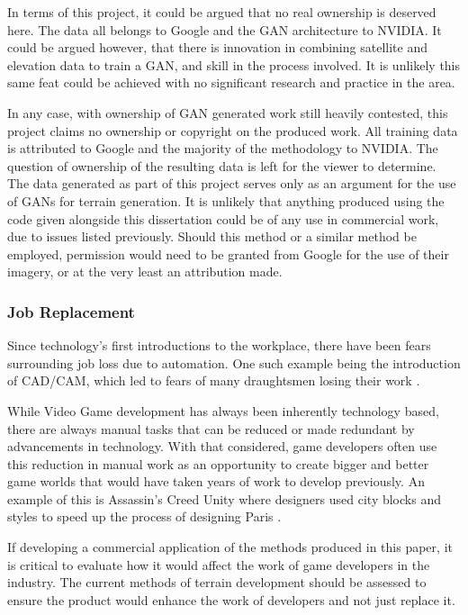 \documentclass[a4paper]{report}
\begin{document}
In terms of this project, it could be argued that no real ownership is deserved here. The data all belongs to Google and the GAN architecture to NVIDIA. It could be argued however, that there is innovation in combining satellite and elevation data to train a GAN, and skill in the process involved. It is unlikely this same feat could be achieved with no significant research and practice in the area.

In any case, with ownership of GAN generated work still heavily contested, this project claims no ownership or copyright on the produced work. All training data is attributed to Google and the majority of the methodology to NVIDIA. The question of ownership of the resulting data is left for the viewer to determine. The data generated as part of this project serves only as an argument for the use of GANs for terrain generation. It is unlikely that anything produced using the code given alongside this dissertation could be of any use in commercial work, due to issues listed previously. Should this method or a similar method be employed, permission would need to be granted from Google for the use of their imagery, or at the very least an attribution made.

\subsubsection{Job Replacement}
Since technology's first introductions to the workplace, there have been fears surrounding job loss due to automation. One such example being the introduction of CAD/CAM, which led to fears of many draughtsmen losing their work \cite{ToDo}.

While Video Game development has always been inherently technology based, there are always manual tasks that can be reduced or made redundant by advancements in technology. With that considered, game developers often use this reduction in manual work as an opportunity to create bigger and better game worlds that would have taken years of work to develop previously. An example of this is Assassin's Creed Unity where designers used city blocks and styles to speed up the process of designing Paris \cite{ign_2014}.

If developing a commercial application of the methods produced in this paper, it is critical to evaluate how it would affect the work of game developers in the industry. The current methods of terrain development should be assessed to ensure the product would enhance the work of developers and not just replace it.
\end{document}
